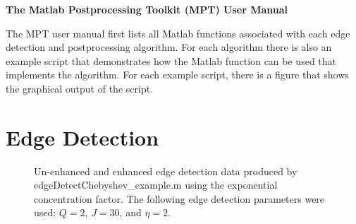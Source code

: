 \documentclass[12pt]{article}
\newcommand{\topic}[1]{\vspace{.15in}\LARGE \textbf{#1} \vspace{.15in} \normalsize }
\begin{document}
\begin{center}
\topic{The Matlab Postprocessing Toolkit (MPT) User Manual}
\end{center}

The MPT user manual first lists all Matlab functions associated with each edge detection and postprocessing algorithm. For each algorithm there is also an example script that demonstrates how the Matlab function can be used that implements the algorithm.   For each example script, there is a figure that shows the graphical output of the script.

\section{Edge Detection}

\begin{figure}[tbh]
   \centering
 \caption{Un-enhanced and enhanced edge detection data produced by edgeDetectChebyshev\_example.m using the exponential concentration factor. The following edge detection parameters were used: $Q=2$, $J=30$, and $\eta=2$.
          } \label{fig:edgeDetect}
 \end{figure}
\end{document}
